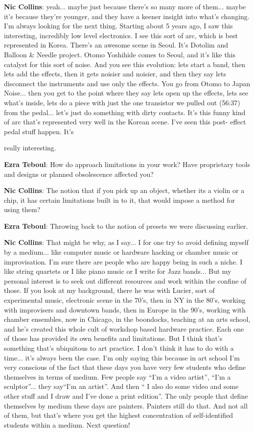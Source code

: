 \textbf{Nic Collins}: yeah... maybe just because there’s so many more of them... maybe it’s because they’re younger, and they have a keener insight into what’s changing. I’m always looking for the next thing. Starting about 5 years ago, I saw this interesting, incredibly low level electronics. I see this sort of arc, which is best represented in Korea. There’s an awesome scene in Seoul. It’s Dotolim and Balloon & Needle project. Otomo Yoshihide comes to Seoul, and it’s like this catalyst for this sort of noise. And you see this evolution: lets start a band, then lets add the effects, then it gets noisier and noisier, and then they say lets disconnect the instruments and use only the effects. You go from Otomo to Japan Noise... then you get to the point where they say lets open up the effects, lets see what’s inside, lets do a piece with just the one transistor we pulled out (56:37) from the pedal... let’s just do something with dirty contacts. It’s this funny kind of arc that’s represented
very well in the Korean scene. I’ve seen this post- effect pedal stuff happen. It’s
					
really interesting.
					
\textbf{Ezra Teboul}: How do approach limitations in your work? Have proprietary tools and designs or planned obsolescence affected you?
					
\textbf{Nic Collins}: The notion that if you pick up an object, whether its a violin or a chip, it has certain limitations built in to it, that would impose a method for using them?
					
\textbf{Ezra Teboul}: Throwing back to the notion of presets we were discussing earlier.
					
\textbf{Nic Collins}: That might be why, as I say... I for one try to avoid defining myself by a medium... like computer music or hardware hacking or chamber music or improvisation. I’m sure there are people who are happy being in such a niche. I like string quartets or I like piano music or I write for Jazz bands... But my personal interest is to seek out different resources and work within the confine of those. If you look at my background, there he was with Lucier, sort of experimental music, electronic scene in the 70’s, then in NY in the 80’s, working with improvisers and downtown bands, then in Europe in the 90’s, working with chamber ensembles, now in Chicago, in the boondocks, teaching at an arts school, and he’s created this whole cult of workshop based hardware practice. Each one of those has provided its own benefits and limitations. But I think that’s something that’s ubiquitous to art practice. I don’t think it has to do with a time... it’s always been the case. I’m only saying this because in art school I’m very conscious of the fact that these days you have very few students who define themselves in terms of medium. Few people say ``I’m a video artist'', ``I’m a sculptor''... they say``I’m an artist''. And then `` I also do some video and some other stuff and I draw and I’ve done a print edition''. The only people that define themselves by medium these days are painters. Painters still do that. And not all of them, but that’s where you get the
highest concentration of self-identified students within a medium. Next question!
					
